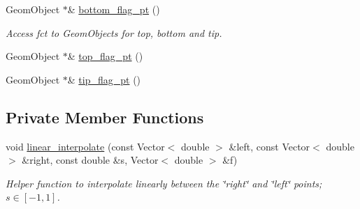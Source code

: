 \begin{DoxyCompactItemize}
Geom\+Object $\ast$\& \hyperlink{classoomph_1_1CylinderWithFlagDomain_a4da493b4e9ddc3fc62f6beb269781e81}{bottom\+\_\+flag\+\_\+pt} ()
\begin{DoxyCompactList}\small\item\em Access fct to Geom\+Objects for top, bottom and tip. \end{DoxyCompactList}\item 
Geom\+Object $\ast$\& \hyperlink{classoomph_1_1CylinderWithFlagDomain_a268642db566b31b686ba8185e8610d8a}{top\+\_\+flag\+\_\+pt} ()
\item 
Geom\+Object $\ast$\& \hyperlink{classoomph_1_1CylinderWithFlagDomain_a9977cf9b4b71f83ba0f4d253164d4e00}{tip\+\_\+flag\+\_\+pt} ()
\end{DoxyCompactItemize}
\subsection*{Private Member Functions}
\begin{DoxyCompactItemize}
\item 
void \hyperlink{classoomph_1_1CylinderWithFlagDomain_aa0f0db0fdf2b271a6dde42ef36e9d40d}{linear\+\_\+interpolate} (const Vector$<$ double $>$ \&left, const Vector$<$ double $>$ \&right, const double \&s, Vector$<$ double $>$ \&f)
\begin{DoxyCompactList}\small\item\em Helper function to interpolate linearly between the \char`\"{}right\char`\"{} and \char`\"{}left\char`\"{} points; $ s \in [-1,1] $. \end{DoxyCompactList}\end{DoxyCompactItemize}
